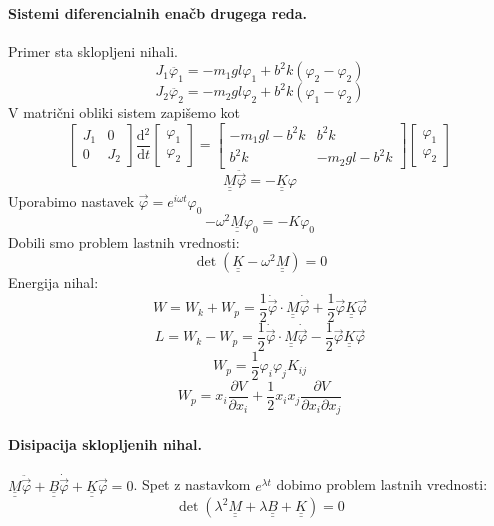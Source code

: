 \documentclass[a4paper]{article}
\newcommand{\vct}[1]{\overrightarrow{#1}}
\newcommand{\pd}[2]{\frac{\partial {#1}}{\partial {#2}}}
\newcommand{\dd}[2]{\frac{\mathrm{d} {#1}}{\mathrm{d} {#2}}}
\newcommand{\duline}[1]{\underline{\underline{#1}}}
\begin{document}
\paragraph{Sistemi diferencialnih enačb drugega reda.} Primer sta sklopljeni nihali.
$$J_1\ddot{\varphi_1} = -m_1gl\varphi_1 + b^2k(\varphi_2 - \varphi_2)$$
$$J_2\ddot{\varphi_2} = -m_2gl\varphi_2 + b^2k(\varphi_1 - \varphi_2)$$
V matrični obliki sistem zapišemo kot
$$\begin{bmatrix}
    J_1 & 0 \\
    0 & J_2
\end{bmatrix}\dd{^2}{t}\begin{bmatrix}
    \varphi_1 \\ \varphi_2
\end{bmatrix} = \begin{bmatrix}
    -m_1gl - b^2k & b^2k \\
    b^2k & -m_2gl - b^2k
\end{bmatrix}\begin{bmatrix}
    \varphi_1 \\ \varphi_2
\end{bmatrix}$$
$$\duline{M}\ddot{\vct{\varphi}} = -\duline{K}\varphi$$
Uporabimo nastavek $\vct{\varphi} = e^{i\omega t}\varphi_0$
$$-\omega^2\duline{M}\varphi_0 = -K\varphi_0$$
Dobili smo problem lastnih vrednosti:
$$\det(\duline{K} - \omega^2\duline{M}) = 0$$
Energija nihal:
$$W = W_k + W_p = \frac{1}{2}\dot{\vct{\varphi}}\cdot\duline{M}\dot{\vct{\varphi}} + \frac{1}{2}\vct{\varphi}\duline{K}\vct{\varphi}$$
$$L = W_k - W_p = \frac{1}{2}\dot{\vct{\varphi}}\cdot\duline{M}\dot{\vct{\varphi}} - \frac{1}{2}\vct{\varphi}\duline{K}\vct{\varphi}$$
$$W_p = \frac{1}{2}\varphi_i\varphi_jK_{ij}$$
$$W_p= x_i\pd{V}{x_i} + \frac{1}{2}x_ix_j\pd{V}{x_i \partial x_j}$$
\paragraph{Disipacija sklopljenih nihal.} $\duline{M}\ddot{\vct{\varphi}} + \duline{B}\dot{\vct{\varphi}} + \duline{K}\vct{\varphi} = 0$.
Spet z nastavkom $e^{\lambda t}$ dobimo problem lastnih vrednosti:
$$\det(\lambda^2\duline{M}+\lambda\duline{B}+\duline{K})=0$$
\end{document}
